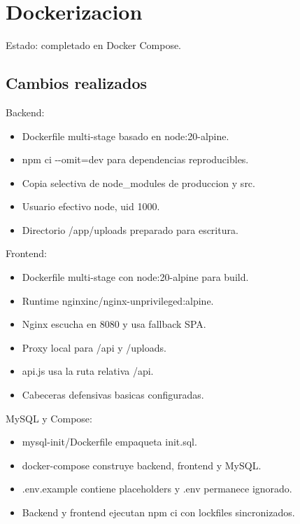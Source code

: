 \section{Dockerizacion}\label{dockerizacion}

Estado: completado en Docker Compose.

\subsection{Cambios realizados}\label{cambios-realizados}

Backend:

\begin{itemize}
\tightlist
\item
  Dockerfile multi-stage basado en node:20-alpine.
\item
  npm ci -\/-omit=dev para dependencias reproducibles.
\item
  Copia selectiva de node\_modules de produccion y src.
\item
  Usuario efectivo node, uid 1000.
\item
  Directorio /app/uploads preparado para escritura.
\end{itemize}

Frontend:

\begin{itemize}
\tightlist
\item
  Dockerfile multi-stage con node:20-alpine para build.
\item
  Runtime nginxinc/nginx-unprivileged:alpine.
\item
  Nginx escucha en 8080 y usa fallback SPA.
\item
  Proxy local para /api y /uploads.
\item
  api.js usa la ruta relativa /api.
\item
  Cabeceras defensivas basicas configuradas.
\end{itemize}

MySQL y Compose:

\begin{itemize}
\tightlist
\item
  mysql-init/Dockerfile empaqueta init.sql.
\item
  docker-compose construye backend, frontend y MySQL.
\item
  .env.example contiene placeholders y .env permanece ignorado.
\item
  Backend y frontend ejecutan npm ci con lockfiles sincronizados.
\end{itemize}

